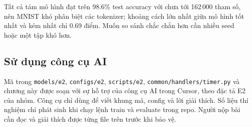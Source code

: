 Tất cả tám mô hình đạt trên 98.6\% test accuracy với chưa tới 162\,000 tham số, nên MNIST khó phân biệt các tokenizer; khoảng cách lớn nhất giữa mô hình tốt nhất và kém nhất chỉ 0.69 điểm. Muốn so sánh chắc chắn hơn cần nhiều seed hoặc một tập khó hơn.
\subsection{Sử dụng công cụ AI}
Mã trong \texttt{models/e2}, \texttt{configs/e2}, \texttt{scripts/e2}, \texttt{common/handlers/timer.py} và chương này được soạn với sự hỗ trợ của công cụ AI trong Cursor, theo đặc tả E2 của nhóm. Công cụ chỉ dùng để viết khung mã, config và lời giải thích. Số liệu thí nghiệm chỉ phát sinh khi chạy lệnh train và evaluate trong repo. Người nộp bài cần đọc và giải thích được từng file trên trước khi bảo vệ.

